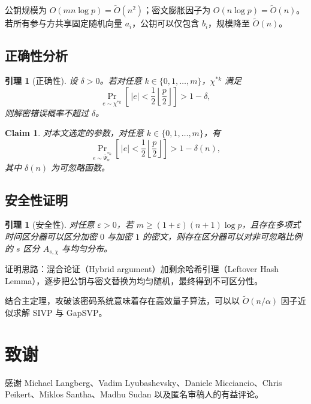 \documentclass[11pt,a4paper]{article}
\newtheorem{lemma}[theorem]{引理}
\newtheorem{claim}[theorem]{Claim}
\newcommand{\Psibar}{\overline{\Psi}}
\begin{document}
公钥规模为 $O(mn\log p)=\widetilde{O}(n^{2})$；密文膨胀因子为 $O(n\log p)=\widetilde{O}(n)$。若所有参与方共享固定随机向量 $a_{i}$，公钥可以仅包含 $b_{i}$，规模降至 $\widetilde{O}(n)$。

\subsection{正确性分析}

\begin{lemma}[正确性]
设 $\delta>0$。若对任意 $k\in\{0,1,\dots,m\}$，$\chi^{*k}$ 满足
\[
  \Pr_{e\sim\chi^{*k}}\!\left[\,|e|<\frac{1}{2}\left\lfloor\frac{p}{2}\right\rfloor\right]>1-\delta,
\]
则解密错误概率不超过 $\delta$。
\end{lemma}

\begin{claim}
对本文选定的参数，对任意 $k\in\{0,1,\dots,m\}$，有
\[
  \Pr_{e\sim\Psibar_{\alpha}^{*k}}
  \left[\,|e|<\frac{1}{2}\left\lfloor\frac{p}{2}\right\rfloor\right]>1-\delta(n),
\]
其中 $\delta(n)$ 为可忽略函数。
\end{claim}

\subsection{安全性证明}

\setcounter{theorem}{3} %
\begin{lemma}[安全性]
对任意 $\varepsilon>0$，若 $m\ge(1+\varepsilon)(n+1)\log p$，且存在多项式时间区分器可以区分加密 $0$ 与加密 $1$ 的密文，则存在区分器可以对非可忽略比例的 $s$ 区分 $A_{s,\chi}$ 与均匀分布。
\end{lemma}

证明思路：混合论证（Hybrid argument）加剩余哈希引理（Leftover Hash Lemma），逐步把公钥与密文替换为均匀随机，最终得到不可区分性。

结合主定理，攻破该密码系统意味着存在高效量子算法，可以以 $\widetilde{O}(n/\alpha)$ 因子近似求解 SIVP 与 GapSVP。

\section*{致谢}

感谢 Michael Langberg、Vadim Lyubashevsky、Daniele Micciancio、Chris Peikert、Miklos Santha、Madhu Sudan 以及匿名审稿人的有益评论。
\end{document}
